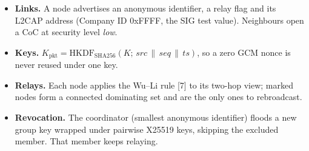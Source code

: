 \documentclass{article}
\begin{document}
\begin{minipage}[t][935mm][t]{245mm}
\begin{itemize}
  \item \textbf{Links.} A node advertises an anonymous identifier, a relay
        flag and its L2CAP address (Company ID 0xFFFF, the SIG test
        value). Neighbours open a CoC at security level \emph{low}.
  \item \textbf{Keys.} $K_{\mathrm{pkt}} = \mathrm{HKDF}_{\mathrm{SHA256}}(K;\,
        \mathit{src}\,\|\,\mathit{seq}\,\|\,\mathit{ts})$, so a zero GCM
        nonce is never reused under one key.
  \item \textbf{Relays.} Each node applies the Wu--Li rule [7] to its
        two-hop view; marked nodes form a connected dominating set and
        are the only ones to rebroadcast.
  \item \textbf{Revocation.} The coordinator (smallest anonymous
        identifier) floods a new group key wrapped under pairwise X25519
        keys, skipping the excluded member. That member keeps relaying.
\end{itemize}
\end{minipage}%
\hspace{20mm}%
\end{document}
